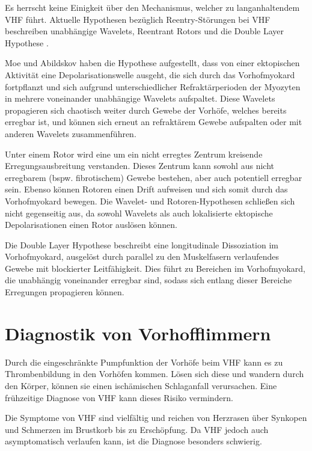 Es herrscht keine Einigkeit über den Mechanismus, welcher zu langanhaltendem \gls{VHF} führt. Aktuelle Hypothesen bezüglich Reentry-Störungen bei \gls{VHF} beschreiben unabhängige Wavelets, Reentrant Rotors und die Double Layer Hypothese \cite{staerk_atrial_2017}. 

Moe und Abildskov \cite{moe_atrial_1959} haben die Hypothese aufgestellt, dass von einer ektopischen Aktivität eine Depolarisationswelle ausgeht, die sich durch das Vorhofmyokard fortpflanzt und sich aufgrund unterschiedlicher Refraktärperioden der Myozyten in mehrere voneinander unabhängige Wavelets aufspaltet. Diese Wavelets propagieren sich chaotisch weiter durch Gewebe der Vorhöfe, welches bereits erregbar ist, und können sich erneut an refraktärem Gewebe aufspalten oder mit anderen Wavelets zusammenführen.

Unter einem Rotor wird eine um ein nicht erregtes Zentrum kreisende Erregungsausbreitung verstanden. Dieses Zentrum kann sowohl aus nicht erregbarem (bspw. fibrotischem) Gewebe bestehen, aber auch potentiell erregbar sein. Ebenso können Rotoren einen Drift aufweisen und sich somit durch das Vorhofmyokard bewegen. Die Wavelet- und Rotoren-Hypothesen schließen sich nicht gegenseitig aus, da sowohl Wavelets als auch lokalisierte ektopische Depolarisationen einen Rotor auslösen können. \cite{guillem_presence_2016}
 
Die Double Layer Hypothese beschreibt eine longitudinale Dissoziation im Vorhofmyokard, ausgelöst durch parallel zu den Muskelfasern verlaufendes Gewebe mit blockierter Leitfähigkeit. Dies führt zu Bereichen im Vorhofmyokard, die unabhängig voneinander erregbar sind, sodass sich entlang dieser Bereiche Erregungen propagieren können. \cite{allessie_electropathological_2010}


\section{Diagnostik von Vorhofflimmern}\label{sec:DiagVorhofflimmern}

Durch die eingeschränkte Pumpfunktion der Vorhöfe beim \gls{VHF} kann es zu Thrombenbildung in den Vorhöfen kommen. Lösen sich diese und wandern durch den Körper, können sie einen ischämischen Schlaganfall verursachen. Eine frühzeitige Diagnose von \gls{VHF} kann dieses Risiko vermindern. \cite{erdmann_klinische_2011}

Die Symptome von \gls{VHF} sind vielfältig und reichen von Herzrasen über Synkopen und Schmerzen im Brustkorb bis zu Erschöpfung. Da \gls{VHF} jedoch auch asymptomatisch verlaufen kann, ist die Diagnose besonders schwierig. \cite{brundel_atrial_2022}

